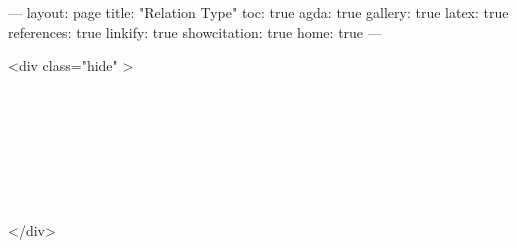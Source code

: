 ---
layout: page
title: "Relation Type"
toc: true
agda: true
gallery: true
latex: true
references: true
linkify: true
showcitation: true
home: true
---

<div class="hide" >
\begin{code}%
\>[0]\AgdaSymbol{\{-\#}\AgdaSpace{}%
\AgdaSpace{}%
\AgdaSpace{}%
\AgdaSymbol{\#-\}}\<%
\\
\>[0]\AgdaSpace{}%
\AgdaSpace{}%
\<%
\\
\>[0]\AgdaSpace{}%
\AgdaSpace{}%
\<%
\\
%
\\[\AgdaEmptyExtraSkip]%
\>[0]\AgdaSpace{}%
\AgdaSpace{}%
\<%
\\
\>[0]\AgdaSpace{}%
\AgdaSpace{}%
\<%
\\
\>[0]\AgdaSpace{}%
\AgdaSpace{}%
\<%
\end{code}
</div>


